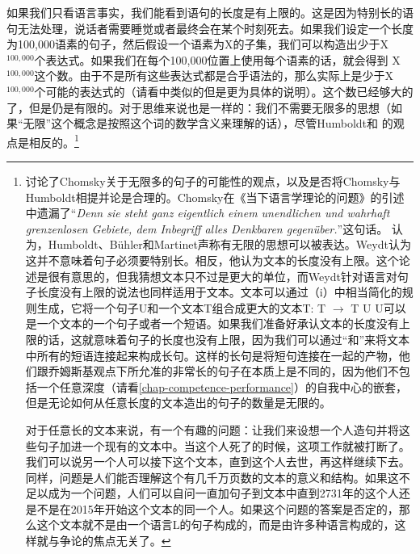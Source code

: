 \noindent
如果我们只看语言事实，我们能看到语句的长度是有上限的。这是因为特别长的语句无法处理，说话者需要睡觉或者最终会在某个时刻死去。如果我们设定一个长度为100,000语素的句子，然后假设一个语素为X的子集，我们可以构造出少于X$^{100,000}$个表达式。如果我们在每个100,000位置上使用每个语素的话，就会得到 X$^{100,000}$这个数。由于不是所有这些表达式都是合乎语法的，那么实际上是少于X$^{100,000}$个可能的表达式的（请看\citealp{Weydt72a}中类似的但是更为具体的说明）。这个数已经够大的了，但是仍是有限的。对于思维来说也是一样的：我们不需要无限多的思想（如果“无限”这个概念是按照这个词的数学含义来理解的话），尽管Humboldt和 \citet[]{Chomsky2008a}的观点是相反的。\footnote{%
 \citet{Weydt72a}讨论了Chomsky关于无限多的句子的可能性的观点，以及是否将Chomsky与Humboldt相提并论是合理的。Chomsky在《当下语言学理论的问题》\citep[]{Chomsky70b-ut}的引述中遗漏了“\emph{Denn sie steht ganz eigentlich einem unendlichen und
    wahrhaft grenzenlosen Gebiete, dem Inbegriff alles Denkbaren gegenüber.}”这句话。 \citet[]{Weydt72a}认为，Humboldt、Bühler和Martinet声称有无限的思想可以被表达。Weydt认为这并不意味着句子必须要特别长。相反，他认为文本的长度没有上限。这个论述是很有意思的，但我猜想文本只不过是更大的单位，而Weydt针对语言对句子长度没有上限的说法也同样适用于文本。文本可以通过（i）中相当简化的规则生成，它将一个句子U和一个文本T组合成更大的文本T:
  \ea
  T $\to$ T U
  \z
U可以是一个文本的一个句子或者一个短语。如果我们准备好承认文本的长度没有上限的话，这就意味着句子的长度也没有上限，因为我们可以通过“和”来将文本中所有的短语连接起来构成长句。这样的长句是将短句连接在一起的产物，他们跟乔姆斯基观点下所允准的非常长的句子在本质上是不同的，因为他们不包括一个任意深度（请看\ref{chap-competence-performance}）的自我中心的嵌套，但是无论如何从任意长度的文本造出的句子的数量是无限的。

对于任意长的文本来说，有一个有趣的问题：让我们来设想一个人造句并将这些句子加进一个现有的文本中。当这个人死了的时候，这项工作就被打断了。我们可以说另一个人可以接下这个文本，直到这个人去世，再这样继续下去。同样，问题是人们能否理解这个有几千万页数的文本的意义和结构。如果这不足以成为一个问题，人们可以自问一直加句子到文本中直到2731年的这个人还是不是在2015年开始这个文本的同一个人。如果这个问题的答案是否定的，那么这个文本就不是由一个语言L的句子构成的，而是由许多种语言构成的，这样就与争论的焦点无关了。
} 
